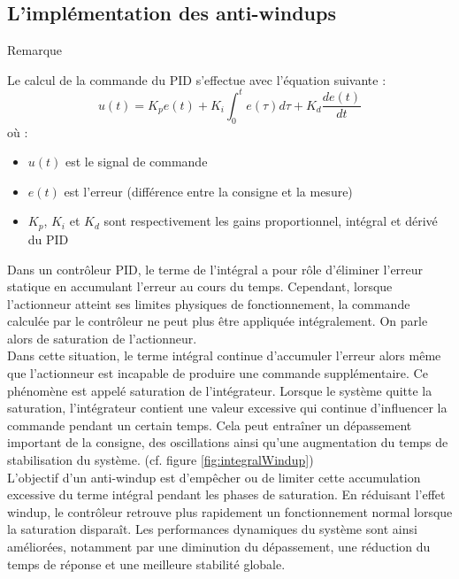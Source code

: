 \subsection{L'implémentation des anti-windups}
\label{sec:anti_windup}

\RemarkBox
{Remarque}
{
    Le calcul de la commande du PID s'effectue avec l'équation suivante :
    \begin{equation}
        u(t) = K_p e(t) + K_i \int_{0}^{t} e(\tau) d\tau + K_d \frac{de(t)}{dt}
    \end{equation}
    où :
    \begin{itemize}
        \item $u(t)$ est le signal de commande
        \item $e(t)$ est l'erreur (différence entre la consigne et la mesure)
        \item $K_p$, $K_i$ et $K_d$ sont respectivement les gains proportionnel, intégral et dérivé du PID
    \end{itemize}
}

Dans un contrôleur PID, le terme de l'intégral a pour rôle d'éliminer l'erreur statique en accumulant l'erreur au cours du temps. Cependant, lorsque l'actionneur atteint ses limites physiques de fonctionnement, la commande calculée par le contrôleur ne peut plus être appliquée intégralement. On parle alors de saturation de l'actionneur. \\

Dans cette situation, le terme intégral continue d'accumuler l'erreur alors même que l'actionneur est incapable de produire une commande supplémentaire. Ce phénomène est appelé saturation de l'intégrateur. Lorsque le système quitte la saturation, l'intégrateur contient une valeur excessive qui continue d'influencer la commande pendant un certain temps. Cela peut entraîner un dépassement important de la consigne, des oscillations ainsi qu'une augmentation du temps de stabilisation du système. (cf. figure \ref{fig:integralWindup}) \\

L'objectif d'un anti-windup est d'empêcher ou de limiter cette accumulation excessive du terme intégral pendant les phases de saturation. En réduisant l'effet windup, le contrôleur retrouve plus rapidement un fonctionnement normal lorsque la saturation disparaît. Les performances dynamiques du système sont ainsi améliorées, notamment par une diminution du dépassement, une réduction du temps de réponse et une meilleure stabilité globale. \\

